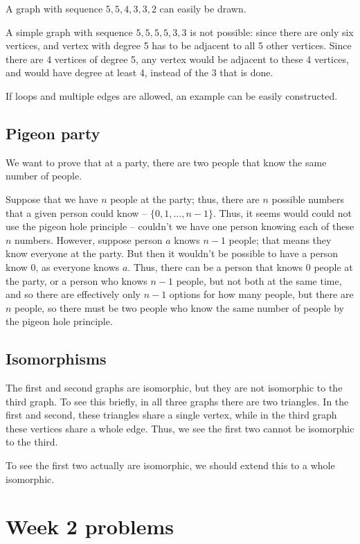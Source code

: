 \documentclass{amsart}
\begin{document}
A graph with sequence $5,5,4,3,3,2$ can easily be drawn.

A simple graph with sequence $5, 5, 5, 5, 3, 3$ is not possible: since there are only six vertices, and vertex with degree 5 has to be adjacent to all 5 other vertices.  Since there are 4 vertices of degree 5, any vertex would be adjacent to these 4 vertices, and would have degree at least 4, instead of the 3 that is done.

If loops and multiple edges are allowed, an example can be easily constructed.

\subsection{Pigeon party}
We want to prove that at a party, there are two people that know the same number of people.

Suppose that we have $n$ people at the party; thus, there are $n$ possible numbers that a given person could know -- $\{0,1,\dots, n-1\}$.  Thus, it seems would could not use the pigeon hole principle -- couldn't we have one person knowing each of these $n$ numbers.  However, suppose person $a$ knows $n-1$ people; that means they know everyone at the party.  But then it wouldn't be possible to have a person know $0$, as everyone knows $a$.  Thus, there can be a person that knows $0$ people at the party, or a person who knows $n-1$ people, but not both at the same time, and so there are effectively only $n-1$ options for how many people, but there are $n$ people, so there must be two people who know the same number of people by the pigeon hole principle.

\subsection{Isomorphisms}

The first and second graphs are isomorphic, but they are not isomorphic to the third graph.  To see this briefly, in all three graphs there are two triangles.  In the first and second, these triangles share a single vertex, while in the third graph these vertices share a whole edge.  Thus, we see the first two cannot be isomorphic to the third.

To see the first two actually are isomorphic, we should extend this to a whole isomorphic.  

\section{Week 2 problems}
\end{document}
